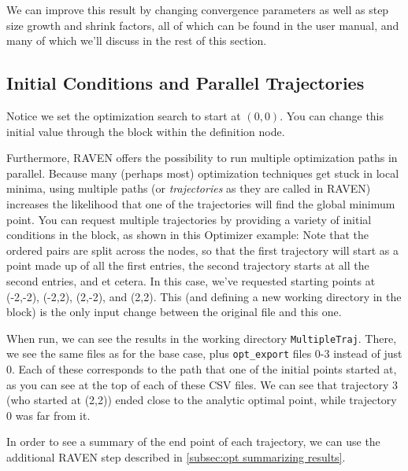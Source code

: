 We can improve this result by changing convergence
parameters as well as step size growth and shrink factors, all of which can be found in the user manual, and
many of which we'll discuss in the rest of this section.

\subsection{Initial Conditions and Parallel Trajectories} \label{subsec:opt parallel traj}
Notice we set the optimization search to start at $(0,0)$.
You can change this initial value through
the  block within the  definition node.

Furthermore, RAVEN offers the possibility to run multiple optimization paths in parallel.  Because many
(perhaps most) optimization techniques get stuck in local minima, using multiple paths (or \emph{trajectories} as
they are called in RAVEN) increases the likelihood that one of the trajectories will find the global minimum
point.  You can request multiple trajectories by providing a variety of initial conditions in the
 block, as shown in this Optimizer example:
Note that the ordered pairs are split across the  nodes, so that the first trajectory will
start as a point made up of all the first entries, the second trajectory starts at all the second entries, and
et cetera.  In this case, we've requested starting points at (-2,-2), (-2,2), (2,-2), and (2,2).  This (and
defining a new working directory in the  block) is the only input change between the original
file and this one.

When run, we can see the results in the working directory \texttt{MultipleTraj}.  There, we see the same files
as for the base case, plus \texttt{opt\_export} files 0-3 instead of just 0.  Each of these corresponds to the
path that one of the initial points started at, as you can see at the top of each of these CSV files.  We can
see that trajectory 3 (who started at (2,2)) ended close to the analytic optimal point, while trajectory 0
was far from it.

In order to see a summary of the end point of each trajectory, we can use the additional RAVEN step described
in \ref{subsec:opt summarizing results}.


